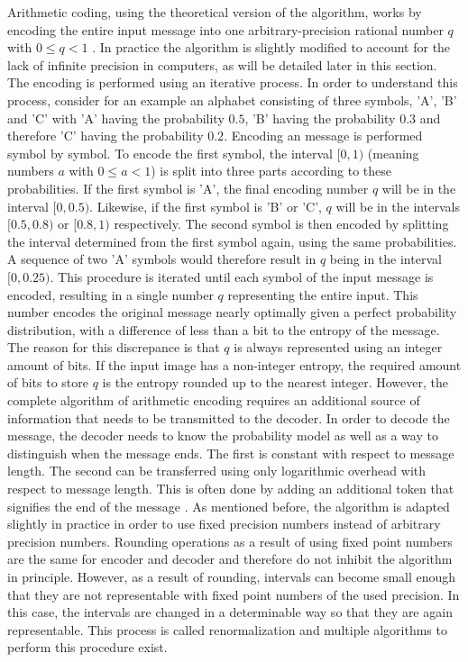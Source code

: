 Arithmetic coding, using the theoretical version of the algorithm, works by encoding the entire input message into one arbitrary-precision rational number $q$ with $0 \leq q < 1$ \citep{said_introduction_2023}. In practice the algorithm is slightly modified to account for the lack of infinite precision in computers, as will be detailed later in this section. The encoding is performed using an iterative process. In order to understand this process, consider for an example an alphabet consisting of three symbols, 'A', 'B' and 'C' with 'A' having the probability $0.5$, 'B' having the probability $0.3$ and therefore 'C' having the probability $0.2$. Encoding an message is performed symbol by symbol. To encode the first symbol, the interval $[0,1)$ (meaning numbers $a$ with $0 \leq a < 1$) is split into three parts according to these probabilities. If the first symbol is 'A', the final encoding number $q$ will be in the interval $[0,0.5)$. Likewise, if the first symbol is 'B' or 'C', $q$ will be in the intervals $[0.5,0.8)$ or $[0.8,1)$ respectively. The second symbol is then encoded by splitting the interval determined from the first symbol again, using the same probabilities. A sequence of two 'A' symbols would therefore result in $q$ being in the interval $[0,0.25)$. This procedure is iterated until each symbol of the input message is encoded, resulting in a single number $q$ representing the entire input. This number encodes the original message nearly optimally given a perfect probability distribution, with a difference of less than a bit to the entropy of the message. The reason for this discrepance is that $q$ is always represented using an integer amount of bits. If the input image has a non-integer entropy, the required amount of bits to store $q$ is the entropy rounded up to the nearest integer. However, the complete algorithm of arithmetic encoding requires an additional source of information that needs to be transmitted to the decoder. In order to decode the message, the decoder needs to know the probability model as well as a way to distinguish when the message ends. The first is constant with respect to message length. The second can be transferred using only logarithmic overhead with respect to message length. This is often done by adding an additional token that signifies the end of the message \citep{said_introduction_2023}.
As mentioned before, the algorithm is adapted slightly in practice in order to use fixed precision numbers instead of arbitrary precision numbers. Rounding operations as a result of using fixed point numbers are the same for encoder and decoder and therefore do not inhibit the algorithm in principle. However, as a result of rounding, intervals can become small enough that they are not representable with fixed point numbers of the used precision. In this case, the intervals are changed in a determinable way so that they are again representable. This process is called renormalization and multiple algorithms to perform this procedure exist.

